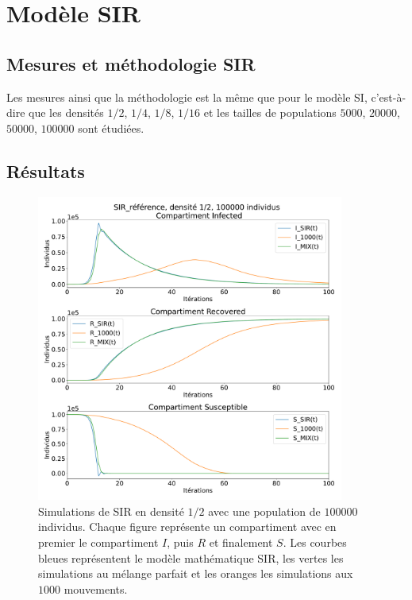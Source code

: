 \chapter{Modèle SIR} \label{ch:SIR}

\section{Mesures et méthodologie SIR}

Les mesures ainsi que la méthodologie est la même que pour le modèle SI, c'est-à-dire que les densités $1/2$, $1/4$, $1/8$, $1/16$ et les tailles de populations $5000$, $20000$, $50000$, $100000$ sont étudiées.

\newpage

\section{Résultats}

\begin{figure}[h]
	\centering
	\captionsetup{justification=centering}
	\includegraphics[width=0.9\textwidth]{Images/SIR_ref_2_100.pdf}
	\caption[Simulation SIR, densité $1/2$]{Simulations de SIR en densité $1/2$ avec une population de $100000$ individus. Chaque figure représente un compartiment avec en premier le compartiment $I$, puis $R$ et finalement $S$. Les courbes bleues représentent le modèle mathématique SIR, les vertes les simulations au mélange parfait et les oranges les simulations aux $1000$ mouvements.}
\end{figure}

